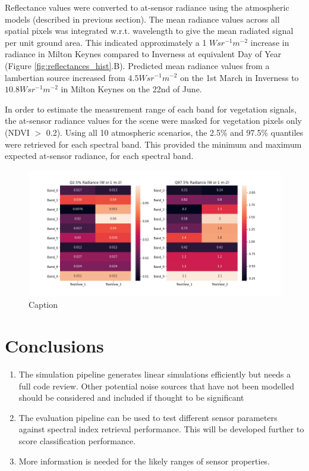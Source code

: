 \documentclass[10pt,a4paper,final,onecolumn]{article}
\begin{document}
Reflectance values were converted to at-sensor radiance using the atmospheric models (described in previous section). The mean radiance values across all spatial pixels was integrated w.r.t. wavelength to give the mean radiated signal per unit ground area. This indicated approximately a 1 $W sr^{-1} m^{-2}$ increase in radiance in Milton Keynes compared to Inverness at equivalent Day of Year (Figure \ref{fig:reflectances_hist}.B). Predicted mean radiance values from a lambertian source increased from $4.5 W sr^{-1} m^{-2}$ on the 1st March in Inverness to $10.8 W sr^{-1} m^{-2}$ in Milton Keynes on the 22nd of June.

In order to estimate the measurement range of each band for vegetation signals, the at-sensor radiance values for the scene were masked for vegetation pixels only (NDVI $>$ 0.2). Using all 10 atmospheric scenarios, the 2.5\% and 97.5\% quantiles were retrieved for each spectral band. This provided the minimum and maximum expected at-sensor radiance, for each spectral band.

\begin{figure}
    \centering
    \includegraphics[width=\textwidth]{TreeView_plots/5_minMax_radiance.png}
    \caption{Caption}
    \label{fig:my_label}
\end{figure}
\section{Conclusions}
\begin{enumerate}
\item The simulation pipeline generates linear simulations efficiently but needs a full code review. Other potential noise sources that have not been modelled should be considered and included if thought to be significant
\item The evaluation pipeline can be used to test different sensor parameters against spectral index retrieval performance. This will be developed further to score classification performance.
\item More information is needed for the likely ranges of sensor properties.
\end{enumerate}


\end{document}
